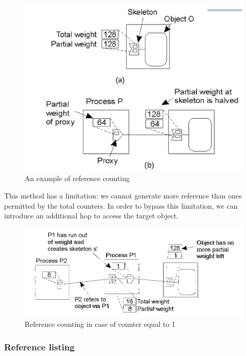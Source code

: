\begin{figure}[h]
    \caption{An example of reference counting}
    \includegraphics[scale=0.5]{src/images/reference-counting.png}
    \centering
\end{figure}

This method has a limitation: we cannot generate more reference than
ones permitted by the total counters. In order to bypass this
limitation, we can introduce an additional hop to access the target
object.

\begin{figure}[h]
    \caption{Reference counting in case of counter equal to 1}
    \includegraphics[scale=0.3]{src/images/reference-counting-new-counter.png}
    \centering
\end{figure}

\subsubsection{Reference listing}

